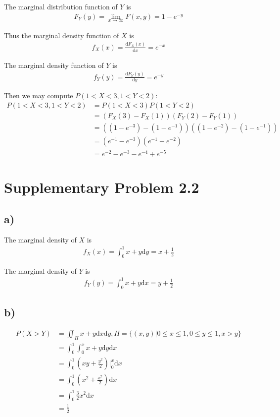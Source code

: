 \documentclass[a4paper, UTF-8]{article}
\theoremstyle{plain}
\begin{document}
The marginal distribution function of $Y$ is
\begin{align*}
F_Y(y) = \lim_{x \to \infty} F(x, y) = 1 - e^{- y}
\end{align*}

Thus the marginal density function of $X$ is
\begin{align*}
f_X(x) = \frac{\mathrm{d}F_X(x)}{\mathrm{d}x} = e^{- x}
\end{align*}

The marginal density function of $Y$ is
\begin{align*}
f_Y(y) = \frac{\mathrm{d}F_Y(y)}{\mathrm{d}y} = e^{- y}
\end{align*}

Then we may compute $P(1 < X < 3, 1 < Y < 2)$:
\begin{align*}
P(1 < X < 3, 1 < Y < 2) &= P(1 < X < 3) P(1 < Y < 2)\\
&= (F_X(3) - F_X(1))(F_Y(2) - F_Y(1))\\
&= ((1 - e^{-3}) - (1 - e^{-1}))((1 - e^{-2}) - (1 - e^{-1}))\\
&= (e^{-1} - e^{-3})(e^{-1} - e^{-2})\\
&= e^{-2} - e^{-3} - e^{-4} + e^{-5}
\end{align*}

\section{Supplementary Problem 2.2}

\subsection{a)}

The marginal density of $X$ is
\begin{align*}
f_X(x) = \int_{0}^1 x + y \mathrm{d}y = x + \frac{1}{2}
\end{align*}

The marginal density of $Y$ is
\begin{align*}
f_Y(y) = \int_{0}^1 x + y \mathrm{d}x = y + \frac{1}{2}
\end{align*}

\subsection{b)} 

\begin{align*} 
P(X > Y) &= \iint_{H}x + y \mathrm{d}x \mathrm{d}y, H = \{(x, y) | 0 \leq x \leq 1, 0 \leq y \leq 1, x > y\}\\
&= \int_{0}^1 \int_{0}^x x + y \mathrm{d}y \mathrm{d}x\\
&= \int_{0}^1 \left(xy + \frac{y^2}{2}\right) \Big|_{0}^x \mathrm{d}x\\
&= \int_{0}^1 \left(x^2 + \frac{x^2}{2}\right) \mathrm{d}x\\
&= \int_{0}^1 \frac{3}{2} x^2 \mathrm{d}x\\
&= \frac{1}{2}
\end{align*}
\end{document}
